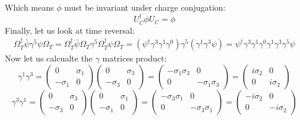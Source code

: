 \documentclass{article}
\begin{document}
Which means $\phi$ must be invariant under charge conjugation:
\begin{equation}
    U_C^\dagger \phi U_C = \phi
\end{equation}
Finally, let us look at time reversal:
\begin{equation}
\begin{gathered}
    \Omega_T^\dagger \bar{\psi}\gamma^5\psi \Omega_T = 
    \Omega_T^\dagger \bar{\psi} \Omega_T \gamma^5 \Omega_T^\dagger \psi \Omega_T = 
    \left(\psi^\dagger\gamma^3\gamma^1\gamma^0\right) \gamma^5 \left(\gamma^1\gamma^3 \psi\right) =
    \psi^\dagger\gamma^3\gamma^1\gamma^0\gamma^1\gamma^3\gamma^5 \psi
\end{gathered}
\end{equation}
Now let us calcualte the $\gamma$ matrices product:
\begin{equation}
    \gamma^1\gamma^3 = \begin{pmatrix}
        0 & \sigma_1 \\ -\sigma_1 & 0
    \end{pmatrix}
    \begin{pmatrix}
        0 & \sigma_3 \\ -\sigma_3 & 0
    \end{pmatrix} =
    \begin{pmatrix}
        -\sigma_1\sigma_3 & 0 \\ 0 & -\sigma_1\sigma_3
    \end{pmatrix} = 
    \begin{pmatrix}
        i\sigma_2 & 0 \\ 0 & i\sigma_2
    \end{pmatrix}
\end{equation}
\begin{equation}
    \gamma^3\gamma^1 = 
    \begin{pmatrix}
        0 & \sigma_3 \\ -\sigma_3 & 0
    \end{pmatrix}
    \begin{pmatrix}
        0 & \sigma_1 \\ -\sigma_1 & 0
    \end{pmatrix} =
    \begin{pmatrix}
        -\sigma_3\sigma_1 & 0 \\ 0 & -\sigma_3\sigma_1
    \end{pmatrix} = 
    \begin{pmatrix}
        -i\sigma_2 & 0 \\ 0 & -i\sigma_2
    \end{pmatrix}
\end{equation}
\end{document}

